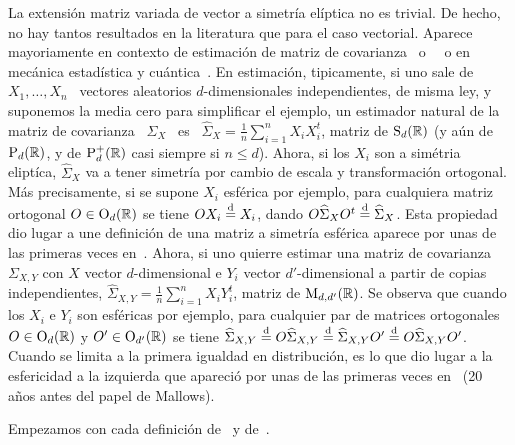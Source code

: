 
\label{Ssec:MP:FamiliaElipticaMatriz}

La  extensi\'on  matriz  variada  de   vector  a  simetr\'ia  el\'iptica  no  es
trivial. De  hecho, no hay tantos resultados  en la literatura que  para el caso
vectorial.   Aparece  mayoriamente en  contexto  de  estimaci\'on  de matriz  de
covarianza~\cite[\S.~13.2]{BilBre99}  o~\cite{Mal61,   Dem69,  Tyl82,  GruRoc90,
  GupVar94,  GupVar95, GupNag99,  FanLi99, And03,  CarGon16} \  o  en mec\'anica
estad\'istica   y  cu\'antica~\cite{Car83,   Meh04,  AndGui10,   LivNov18}.   En
estimaci\'on,  tipicamente, si  uno  sale de  \  $X_1, \ldots,  X_n$ \  vectores
aleatorios $d$-dimensionales independientes, de  misma ley, y suponemos la media
cero  para  simplificar  el  ejemplo,  un  estimador natural  de  la  matriz  de
covarianza \  $\Sigma_X$ \ es \ $\displaystyle  \widehat{\Sigma}_X = \frac{1}{n}
\sum_{i=1}^n X_i X_i^t$, matriz  de $\mathrm{S}_d(\mathbb{R})$ (y a\'un de $\mathrm{P}_d(\mathbb{R})$,
y de $\mathrm{P}_d^+(\mathbb{R})$  casi siempre si $n  \le d$).  Ahora, si los  $X_i$ son a
sim\'etria elipt\'ica, $\widehat{\Sigma}_X$ va  a tener simetr\'ia por cambio de
escala  y transformaci\'on ortogonal.   M\'as precisamente,  si se  supone $X_i$
esf\'erica por  ejemplo, para cualquiera matriz ortogonal  $O \in \mathrm{O}_d(\mathbb{R})$
se  tiene   $O  X_i  \stackrel{\mathrm{d}}{=}   X_i$,  dando  $O  \widehat{\Sigma}_X   O^t  \stackrel{\mathrm{d}}{=}
\widehat{\Sigma}_X$.  Esta propiedad dio lugar  a une definici\'on de una matriz
a simetr\'ia esf\'erica aparece por  unas de las primeras veces en~\cite{Mal61}.
Ahora, si  uno quierre estimar una  matriz de covarianza  $\Sigma_{X,Y}$ con $X$
vector  $d$-dimensional  e $Y_i$  vector  $d'$-dimensional  a  partir de  copias
independientes, $\displaystyle \widehat{\Sigma}_{X,Y} = \frac{1}{n} \sum_{i=1}^n
X_i Y_i^t$,  matriz de $\mathrm{M}_{d,d'}(\mathbb{R})$. Se  observa que cuando  los $X_i$ e
$Y_i$ son esf\'ericas por ejemplo, para cualquier par de matrices ortogonales $O
\in \mathrm{O}_d(\mathbb{R})$ y $O'  \in \mathrm{O}_{d'}(\mathbb{R})$ se tiene $\widehat{\Sigma}_{X,Y}
\stackrel{\mathrm{d}}{=}  O  \widehat{\Sigma}_{X,Y}  \stackrel{\mathrm{d}}{=}  \widehat{\Sigma}_{X,Y}  O'  \stackrel{\mathrm{d}}{=}  O
\widehat{\Sigma}_{X,Y}  O'$.   Cuando  se   limita  a  la  primera  igualdad  en
distribuci\'on,  es  lo que  dio  lugar  a la  esfericidad  a  la izquierda  que
apareci\'o por unas  de las primeras veces en~\cite{Hsu40}  (20 a\~nos antes del
papel de Mallows).

Empezamos  con cada  definici\'on  de~\cite[\S~9.3]{GupNag99} y  de~\cite{Hsu40,
  Mal61, Dem69,  Daw77, Chm80,  FraNg80,Kar81:1, Kar81, Kar89,  JenGoo81, Tyl82,
  Daw78, Daw81, FanChe84, And03}.

